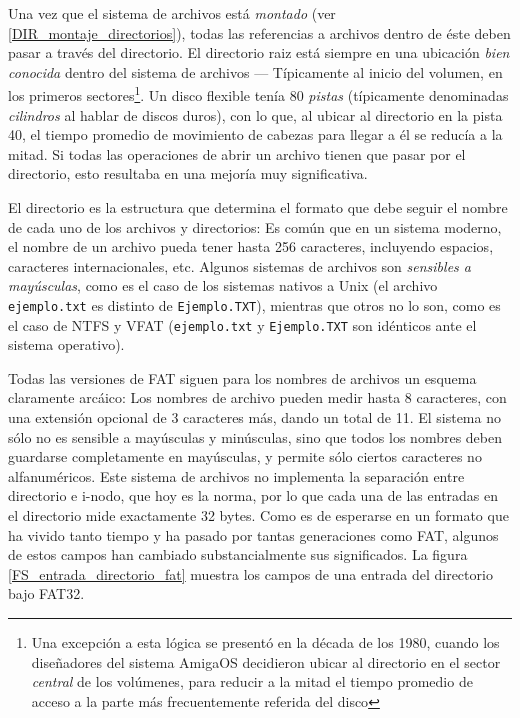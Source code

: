 \documentclass[11pt,fleqn]{book} %
\begin{document}
Una vez que el sistema de archivos está \emph{montado} (ver
\ref{DIR_montaje_directorios}), todas las referencias a archivos
dentro de éste deben pasar a través del directorio. El directorio raiz
está siempre en una ubicación \emph{bien conocida} dentro del sistema de
archivos — Típicamente al inicio del volumen, en los primeros
sectores\footnote{Una excepción a esta lógica se presentó en la década de
los 1980, cuando los diseñadores del sistema AmigaOS decidieron ubicar
al directorio en el sector \emph{central} de los volúmenes, para reducir a
la mitad el tiempo promedio de acceso a la parte más frecuentemente
referida del disco }. Un disco flexible tenía 80 \emph{pistas} (típicamente
denominadas \emph{cilindros} al hablar de discos duros), con lo que,
al ubicar al directorio en la pista 40, el tiempo promedio de
movimiento de cabezas para llegar a él se reducía a la mitad. Si todas
las operaciones de abrir un archivo tienen que pasar por el
directorio, esto resultaba en una mejoría muy significativa.

El directorio es la estructura que determina el formato que debe
seguir el nombre de cada uno de los archivos y directorios: Es común
que en un sistema moderno, el nombre de un archivo pueda tener hasta
256 caracteres, incluyendo espacios, caracteres internacionales, etc. Algunos
sistemas de archivos son \emph{sensibles a mayúsculas}, como es el caso de
los sistemas nativos a Unix (el archivo \texttt{ejemplo.txt} es distinto de
\texttt{Ejemplo.TXT}), mientras que otros no lo son, como es el caso de NTFS
y VFAT (\texttt{ejemplo.txt} y \texttt{Ejemplo.TXT} son idénticos ante el sistema
operativo).

Todas las versiones de FAT siguen para los nombres de archivos un
esquema claramente arcáico: Los nombres de archivo pueden medir hasta
8 caracteres, con una extensión opcional de 3 caracteres más, dando un
total de 11. El sistema no sólo no es sensible a mayúsculas y
minúsculas, sino que todos los nombres deben guardarse completamente
en mayúsculas, y permite sólo ciertos caracteres no
alfanuméricos. Este sistema de archivos no implementa la separación
entre directorio e i-nodo, que hoy es la norma, por lo que cada una de
las entradas en el directorio mide exactamente 32 bytes. Como es de
esperarse en un formato que ha vivido tanto tiempo y ha pasado por
tantas generaciones como FAT, algunos de estos campos han cambiado
substancialmente sus significados. La figura
\ref{FS_entrada_directorio_fat} muestra los campos de una entrada del
directorio bajo FAT32.
\end{document}
